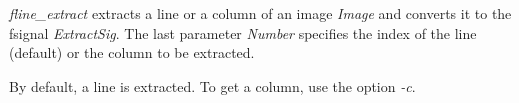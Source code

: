 {\em fline\_extract} extracts a line or a column of an image {\em Image} and 
converts it to the fsignal {\em ExtractSig}. 
The last parameter {\em Number} specifies the index of the line (default) or 
the column to be extracted.

By default, a line is extracted. To get a column, use the option {\em -c}.
